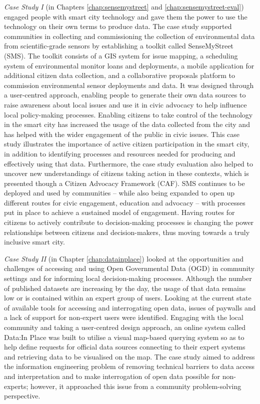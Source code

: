 \begin{introduction}
\noindent
\textit{Case Study I} (in Chapters \ref{chap:sensemystreet} and \ref{chap:sensemystreet-eval}) engaged people with smart city technology and gave them the power to use the technology on their own terms to produce data. The case study supported communities in collecting and commissioning the collection of environmental data from scientific-grade sensors by establishing a toolkit called SenseMyStreet (SMS). The toolkit consists of a GIS system for issue mapping, a scheduling system of environmental monitor loans and deployments, a mobile application for additional citizen data collection, and a collaborative proposals platform to commission environmental sensor deployments and data. It was designed through a user-centred approach, enabling people to generate their own data sources to raise awareness about local issues and use it in civic advocacy to help influence local policy-making processes. Enabling citizens to take control of the technology in the smart city has increased the usage of the data collected from the city and has helped with the wider engagement of the public in civic issues. This case study illustrates the importance of active citizen participation in the smart city, in addition to identifying processes and resources needed for producing and effectively using that data. Furthermore, the case study evaluation also helped to uncover new understandings of citizens taking action in these contexts, which is presented though a Citizen Advocacy Framework (CAF). SMS continues to be deployed and used by communities -- while also being expanded to open up different routes for civic engagement, education and advocacy -- with processes put in place to achieve a sustained model of engagement. Having routes for citizens to actively contribute to decision-making processes is changing the power relationships between citizens and decision-makers, thus moving towards a truly inclusive smart city.
\newline

\noindent
\textit{Case Study II} (in Chapter \ref{chap:datainplace}) looked at the opportunities and challenges of accessing and using Open Governmental Data (OGD) in community settings and for informing local decision-making processes. Although the number of published datasets are increasing by the day, the usage of that data remains low or is contained within an expert group of users. Looking at the current state of available tools for accessing and interrogating open data, issues of paywalls and a lack of support for non-expert users were identified. Engaging with the local community and taking a user-centred design approach, an online system called Data:In Place was built to utilise a visual map-based querying system so as to help define requests for official data sources connecting to their expert systems and retrieving data to be visualised on the map. The case study aimed to address the information engineering problem of removing technical barriers to data access and interpretation and to make interrogation of open data possible for non-experts; however, it approached this issue from a community problem-solving perspective.
\newline


\end{introduction}
